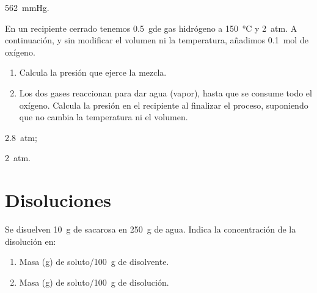 \documentclass[10pt,a5paper,twoside]{article}
\begin{document}
  \begin{solution}
    \SI{562}{\mmHg}.
  \end{solution}




  \begin{exercise}[
      tags    = {termodinámica, entalpía, entalpia de reacción, calor},
      topics  = {química, termoquímica, termodinámica},
      source  = {FQ 1B SAN 2015, p68, e61},
    ]
    En un recipiente cerrado tenemos \SI{0.5}{\gram}de gas hidrógeno a \SI{150}{\celsius} y \SI{2}{atm}. A continuación,
    y sin modificar el volumen ni la temperatura,
    añadimos \SI{0.1}{\mole} de oxígeno.
    \begin{enumerate}
      \item Calcula la presión que ejerce la mezcla.
      \item Los dos gases reaccionan para dar agua (vapor), hasta
      que se consume todo el oxígeno. Calcula la presión
      en el recipiente al finalizar el proceso, suponiendo que
      no cambia la temperatura ni el volumen.
    \end{enumerate}
  \end{exercise}

  \begin{solution}
    \begin{enumerate*}
      \item \SI{2.8}{atm};
      \item \SI{2}{atm}.
    \end{enumerate*}
  \end{solution}





  \section{Disoluciones}

  \begin{exercise}[
      tags    = {termodinámica, entalpía, entalpia de reacción, calor},
      topics  = {química, termoquímica, termodinámica},
      source  = {FQ 1B OXF 2015, p78, e9},
    ]
    Se disuelven \SI{10}{\gram} de sacarosa en \SI{250}{\gram} de agua. Indica la concentración de la disolución en:
    \begin{enumerate}
      \item Masa (\si{\gram}) de soluto/\SI{100}{\gram} de disolvente.
      \item Masa (\si{\gram}) de soluto/\SI{100}{\gram} de disolución.
    \end{enumerate}
  \end{exercise}
\end{document}
